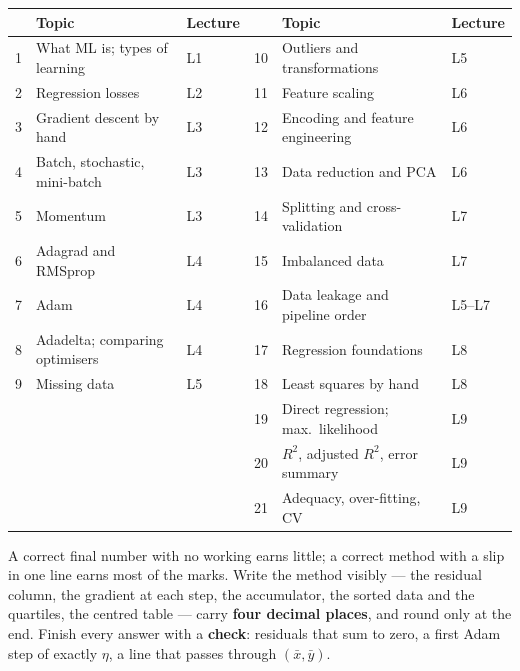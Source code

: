 \documentclass[11pt]{article}
\begin{document}
\begin{center}
\small
\begin{tabular}{@{}rll@{\qquad}rll@{}}
\toprule
& \textbf{Topic} & \textbf{Lecture} & & \textbf{Topic} & \textbf{Lecture}\\ \midrule
1 & What ML is; types of learning & L1 & 10 & Outliers and transformations & L5\\
2 & Regression losses & L2 & 11 & Feature scaling & L6\\
3 & Gradient descent by hand & L3 & 12 & Encoding and feature engineering & L6\\
4 & Batch, stochastic, mini-batch & L3 & 13 & Data reduction and PCA & L6\\
5 & Momentum & L3 & 14 & Splitting and cross-validation & L7\\
6 & Adagrad and RMSprop & L4 & 15 & Imbalanced data & L7\\
7 & Adam & L4 & 16 & Data leakage and pipeline order & L5--L7\\
8 & Adadelta; comparing optimisers & L4 & 17 & Regression foundations & L8\\
9 & Missing data & L5 & 18 & Least squares by hand & L8\\
 & & & 19 & Direct regression; max.\ likelihood & L9\\
 & & & 20 & $R^2$, adjusted $R^2$, error summary & L9\\
 & & & 21 & Adequacy, over-fitting, CV & L9\\
\bottomrule
\end{tabular}
\end{center}

\begin{caution}
A correct final number with no working earns little; a correct method with a
slip in one line earns most of the marks. Write the method visibly --- the
residual column, the gradient at each step, the accumulator, the sorted data
and the quartiles, the centred table --- carry \textbf{four decimal places},
and round only at the end. Finish every answer with a \textbf{check}:
residuals that sum to zero, a first Adam step of exactly $\eta$, a line that
passes through $(\bar x, \bar y)$.
\end{caution}
\end{document}
